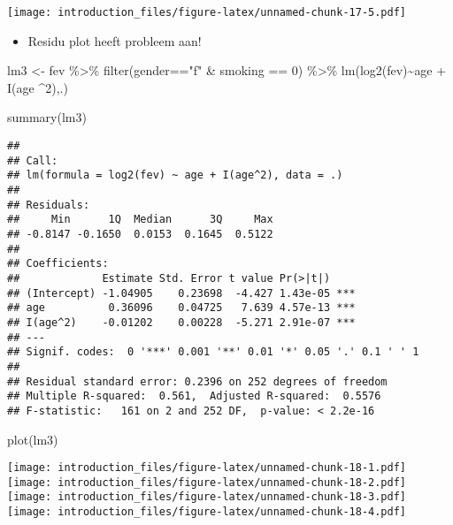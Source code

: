 \documentclass[
]{article}
\newenvironment{Shaded}{\begin{snugshade}}{\end{snugshade}}
\newcommand{\DecValTok}[1]{\textcolor[rgb]{0.00,0.00,0.81}{#1}}
\newcommand{\FunctionTok}[1]{\textcolor[rgb]{0.00,0.00,0.00}{#1}}
\newcommand{\NormalTok}[1]{#1}
\newcommand{\OtherTok}[1]{\textcolor[rgb]{0.56,0.35,0.01}{#1}}
\newcommand{\SpecialCharTok}[1]{\textcolor[rgb]{0.00,0.00,0.00}{#1}}
\newcommand{\StringTok}[1]{\textcolor[rgb]{0.31,0.60,0.02}{#1}}
\providecommand{\tightlist}{%
  \setlength{\itemsep}{0pt}\setlength{\parskip}{0pt}}
\begin{document}
\texttt{[image: introduction\_files/figure-latex/unnamed-chunk-17-5.pdf]}

\begin{itemize}
\tightlist
\item
  Residu plot heeft probleem aan!
\end{itemize}

\begin{Shaded}
\begin{Highlighting}[]
\NormalTok{lm3 }\OtherTok{\textless{}{-}}\NormalTok{ fev }\SpecialCharTok{\%\textgreater{}\%} 
  \FunctionTok{filter}\NormalTok{(gender}\SpecialCharTok{==}\StringTok{"f"} \SpecialCharTok{\&}\NormalTok{ smoking }\SpecialCharTok{==} \DecValTok{0}\NormalTok{) }\SpecialCharTok{\%\textgreater{}\%} 
  \FunctionTok{lm}\NormalTok{(}\FunctionTok{log2}\NormalTok{(fev)}\SpecialCharTok{\textasciitilde{}}\NormalTok{age }\SpecialCharTok{+} \FunctionTok{I}\NormalTok{(age }\SpecialCharTok{\^{}}\DecValTok{2}\NormalTok{),.)}

\FunctionTok{summary}\NormalTok{(lm3)}
\end{Highlighting}
\end{Shaded}

\begin{verbatim}
## 
## Call:
## lm(formula = log2(fev) ~ age + I(age^2), data = .)
## 
## Residuals:
##     Min      1Q  Median      3Q     Max 
## -0.8147 -0.1650  0.0153  0.1645  0.5122 
## 
## Coefficients:
##             Estimate Std. Error t value Pr(>|t|)    
## (Intercept) -1.04905    0.23698  -4.427 1.43e-05 ***
## age          0.36096    0.04725   7.639 4.57e-13 ***
## I(age^2)    -0.01202    0.00228  -5.271 2.91e-07 ***
## ---
## Signif. codes:  0 '***' 0.001 '**' 0.01 '*' 0.05 '.' 0.1 ' ' 1
## 
## Residual standard error: 0.2396 on 252 degrees of freedom
## Multiple R-squared:  0.561,  Adjusted R-squared:  0.5576 
## F-statistic:   161 on 2 and 252 DF,  p-value: < 2.2e-16
\end{verbatim}

\begin{Shaded}
\begin{Highlighting}[]
\FunctionTok{plot}\NormalTok{(lm3)}
\end{Highlighting}
\end{Shaded}

\texttt{[image: introduction\_files/figure-latex/unnamed-chunk-18-1.pdf]}
\texttt{[image: introduction\_files/figure-latex/unnamed-chunk-18-2.pdf]}
\texttt{[image: introduction\_files/figure-latex/unnamed-chunk-18-3.pdf]}
\texttt{[image: introduction\_files/figure-latex/unnamed-chunk-18-4.pdf]}
\end{document}
